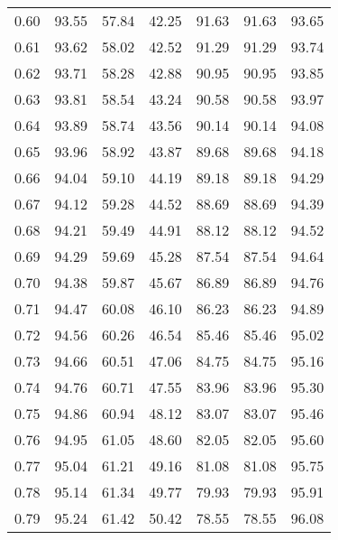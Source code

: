 \begin{tabular}{|c|c|c|c|c|c|c|}
      0.60 &     93.55 &     57.84 &      42.25 &   91.63 &      91.63 &         93.65 \\
      0.61 &     93.62 &     58.02 &      42.52 &   91.29 &      91.29 &         93.74 \\
      0.62 &     93.71 &     58.28 &      42.88 &   90.95 &      90.95 &         93.85 \\
      0.63 &     93.81 &     58.54 &      43.24 &   90.58 &      90.58 &         93.97 \\
      0.64 &     93.89 &     58.74 &      43.56 &   90.14 &      90.14 &         94.08 \\
      0.65 &     93.96 &     58.92 &      43.87 &   89.68 &      89.68 &         94.18 \\
      0.66 &     94.04 &     59.10 &      44.19 &   89.18 &      89.18 &         94.29 \\
      0.67 &     94.12 &     59.28 &      44.52 &   88.69 &      88.69 &         94.39 \\
      0.68 &     94.21 &     59.49 &      44.91 &   88.12 &      88.12 &         94.52 \\
      0.69 &     94.29 &     59.69 &      45.28 &   87.54 &      87.54 &         94.64 \\
      0.70 &     94.38 &     59.87 &      45.67 &   86.89 &      86.89 &         94.76 \\
      0.71 &     94.47 &     60.08 &      46.10 &   86.23 &      86.23 &         94.89 \\
      0.72 &     94.56 &     60.26 &      46.54 &   85.46 &      85.46 &         95.02 \\
      0.73 &     94.66 &     60.51 &      47.06 &   84.75 &      84.75 &         95.16 \\
      0.74 &     94.76 &     60.71 &      47.55 &   83.96 &      83.96 &         95.30 \\
      0.75 &     94.86 &     60.94 &      48.12 &   83.07 &      83.07 &         95.46 \\
      0.76 &     94.95 &     61.05 &      48.60 &   82.05 &      82.05 &         95.60 \\
      0.77 &     95.04 &     61.21 &      49.16 &   81.08 &      81.08 &         95.75 \\
      0.78 &     95.14 &     61.34 &      49.77 &   79.93 &      79.93 &         95.91 \\
      0.79 &     95.24 &     61.42 &      50.42 &   78.55 &      78.55 &         96.08 \\

\end{tabular}
